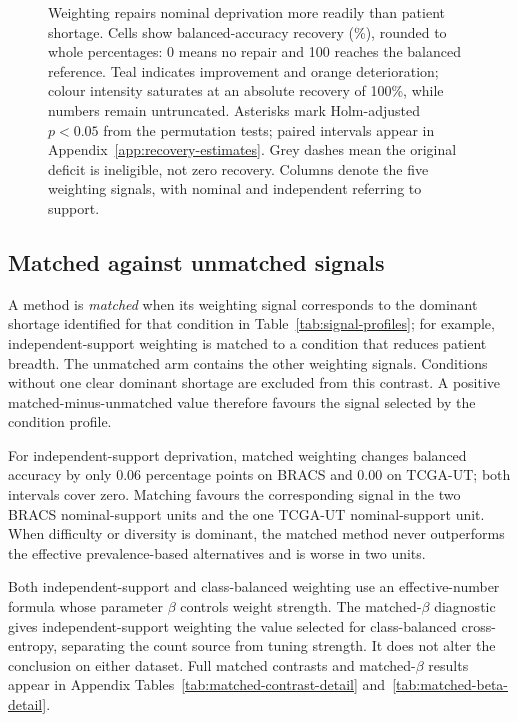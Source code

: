 \documentclass[11pt]{article}
\newcommand{\resultstable}[1]{}
\begin{document}
\begin{figure}[p]
\centering

\caption{Weighting repairs nominal deprivation more readily than patient shortage. Cells show balanced-accuracy recovery (\%), rounded to whole percentages: 0 means no repair and 100 reaches the balanced reference. Teal indicates improvement and orange deterioration; colour intensity saturates at an absolute recovery of 100\%, while numbers remain untruncated. Asterisks mark Holm-adjusted $p<0.05$ from the permutation tests; paired intervals appear in Appendix~\ref{app:recovery-estimates}. Grey dashes mean the original deficit is ineligible, not zero recovery. Columns denote the five weighting signals, with nominal and independent referring to support.}
\label{fig:recovery-overview}
\end{figure}

\subsection{Matched against unmatched signals}
\label{sec:rq2-matched}
A method is \emph{matched} when its weighting signal corresponds to the dominant shortage identified for that condition in Table~\ref{tab:signal-profiles}; for example, independent-support weighting is matched to a condition that reduces patient breadth. The unmatched arm contains the other weighting signals. Conditions without one clear dominant shortage are excluded from this contrast. A positive matched-minus-unmatched value therefore favours the signal selected by the condition profile.

\begin{table}[ht]
  \centering
  \small
  \resultstable{matched_contrast_summary}
  \caption{Matched-minus-unmatched contrasts for balanced accuracy. Intervals are paired \num{95}\% bootstrap intervals.}
  \label{tab:matched-contrast}
\end{table}

\noindent For independent-support deprivation, matched weighting changes balanced accuracy by only \num{0.06} percentage points on BRACS and \num{0.00} on TCGA-UT; both intervals cover zero. Matching favours the corresponding signal in the two BRACS nominal-support units and the one TCGA-UT nominal-support unit. When difficulty or diversity is dominant, the matched method never outperforms the effective prevalence-based alternatives and is worse in two units.

Both independent-support and class-balanced weighting use an effective-number formula whose parameter $\beta$ controls weight strength. The matched-$\beta$ diagnostic gives independent-support weighting the value selected for class-balanced cross-entropy, separating the count source from tuning strength. It does not alter the conclusion on either dataset. Full matched contrasts and matched-$\beta$ results appear in Appendix Tables~\ref{tab:matched-contrast-detail} and~\ref{tab:matched-beta-detail}.
\end{document}
